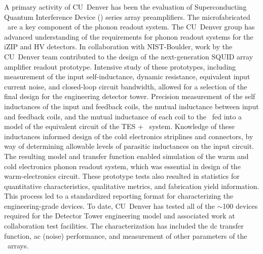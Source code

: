 A primary activity of CU~Denver has been the evaluation of Superconducting Quantum Interference Device (\SQUID) series array preamplifiers. The microfabricated \SQUIDs\ are a key component of the phonon readout system. The CU~Denver group has advanced understanding of the requirements for phonon readout systems for the iZIP and HV detectors.  In collaboration with NIST-Boulder, work by the CU~Denver team contributed to the design of the next-generation SQUID array amplifier readout prototype. Intensive study of these prototypes, including measurement of the input self-inductance, dynamic resistance, equivalent input current noise, and closed-loop circuit bandwidth, allowed for a selection of the final design for the engineering detector tower. Precision measurement of the self inductances of the input and feedback coils, the mutual inductance between input and feedback coils, and the mutual inductance of each coil to the \SQUID\ fed into a model of the equivalent circuit of the TES + \SQUID\ system. Knowledge of these inductances informed design of the cold electronics striplines and connectors, by way of determining allowable levels of parasitic inductances on the input circuit. The resulting model and transfer function enabled simulation of the warm and cold electronics phonon readout system, which was essential in design of the warm-electronics circuit. These prototype tests also resulted in statistics for quantitative characteristics, qualitative metrics, and fabrication yield information. This process led to a standardized reporting format for characterizing the engineering-grade devices. To date, CU~Denver has tested all of  the $\sim$100 devices required for the Detector Tower engineering model and associated work at collaboration test facilities. The characterization has included the dc transfer function, ac (noise) performance, and measurement of other parameters of the \SQUID\ arrays.




